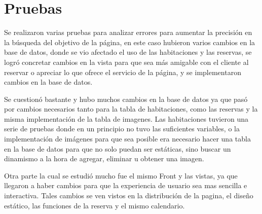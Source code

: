 \section{Pruebas}

Se realizaron varias pruebas para analizar errores para aumentar la precisión en la búsqueda del objetivo de la página, en este caso hubieron varios cambios en la base de datos, donde se vio afectado el uso de las habitaciones y las reservas, se logró concretar cambios en la vista para que sea más amigable con el cliente al reservar o apreciar lo que ofrece el servicio de la página, y se implementaron cambios en la base de datos.

Se cuestionó bastante y hubo muchos cambios en la base de datos ya que pasó por cambios necesarios tanto para la tabla de habitaciones, como las reservas y la misma implementación de la tabla de imagenes. Las habitaciones tuvieron una serie de pruebas donde en un principio no tuvo las suficientes variables, o la implementación de imágenes para que sea posible era necesario hacer una tabla en la base de datos para que no solo puedan ser estáticas, sino buscar un dinamismo a la hora de agregar, eliminar u obtener una imagen.

Otra parte la cual se estudió mucho fue el mismo Front y las vistas, ya que llegaron a haber cambios para que la experiencia de usuario sea mas sencilla e interactiva. Tales cambios se ven vistos en la distribución de la pagina, el diseño estático, las funciones de la reserva y el mismo calendario.
